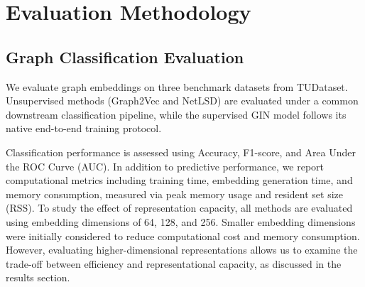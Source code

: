 \section{Evaluation Methodology}








\subsection{Graph Classification Evaluation}
We evaluate graph embeddings on three benchmark datasets from TUDataset.
Unsupervised methods (Graph2Vec and NetLSD) are evaluated under a common downstream
classification pipeline, while the supervised GIN model follows its native
end-to-end training protocol.

Classification performance is assessed using Accuracy, F1-score, and Area Under the ROC Curve (AUC).
In addition to predictive performance, we report computational metrics including
training time, embedding generation time, and memory consumption, measured via
peak memory usage and resident set size (RSS).
To study the effect of representation capacity, all methods are evaluated using
embedding dimensions of 64, 128, and 256. Smaller embedding dimensions were initially considered to reduce computational cost and memory consumption.
However, evaluating higher-dimensional representations allows us to examine the trade-off between efficiency
and representational capacity, as discussed in the results section.


